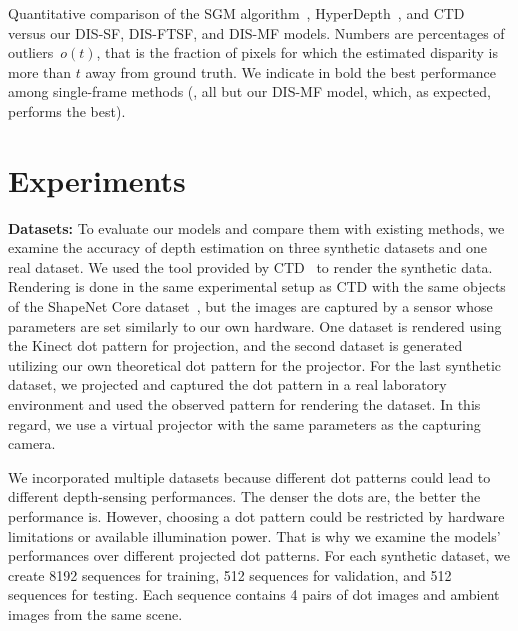 \begin{table}[!t]
\begin{center}
\begin{threeparttable}
\begin{tablenotes}
        \end{tablenotes}
      \end{threeparttable}
    \end{center}
    \caption{Quantitative comparison of the SGM algorithm~\citep{hirschmuller2007stereo}, HyperDepth~\citep{ryan2016hyperdepth}, and CTD~\citep{riegler2019connecting} versus our DIS-SF, DIS-FTSF, and DIS-MF models. Numbers are percentages of outliers~$o(t)$, that is the fraction of pixels for which the estimated disparity is more than $t$ away from ground truth. We indicate in bold the best performance among single-frame methods (\ie, all but our DIS-MF model, which, as expected, performs the best).}
    \label{table:c2_quantitative}
\end{table}

\section{Experiments}
\label{sec:c2_experiments}

\noindent\textbf{Datasets:} To evaluate our models and compare them with existing methods, we examine the accuracy of depth estimation on three synthetic datasets and one real dataset. We used the tool provided by CTD~\citep{riegler2019connecting} to render the synthetic data. Rendering is done in the same experimental setup as CTD with the same objects of the ShapeNet Core dataset~\citep{shapenet2015}, but the images are captured by a sensor whose parameters are set similarly to our own hardware. One dataset is rendered using the Kinect dot pattern for projection, and the second dataset is generated utilizing our own theoretical dot pattern for the projector. For the last synthetic dataset, we projected and captured the dot pattern in a real laboratory environment and used the observed pattern for rendering the dataset. In this regard, we use a virtual projector with the same parameters as the capturing camera.

We incorporated multiple datasets because different dot patterns could lead to different depth-sensing performances. The denser the dots are, the better the performance is. However, choosing a dot pattern could be restricted by hardware limitations or available illumination power. That is why we examine the models' performances over different projected dot patterns. For each synthetic dataset, we create 8192 sequences for training, 512 sequences for validation, and 512 sequences for testing. Each sequence contains 4 pairs of dot images and ambient images from the same scene.

